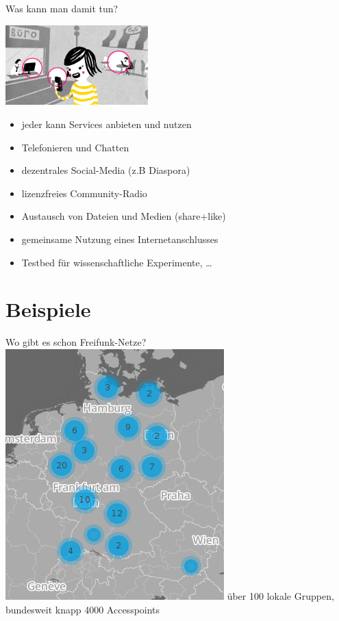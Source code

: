 \documentclass{beamer}
\begin{document}
\begin{frame}{Was kann man damit tun?}
\vfill
\begin{center}
\includegraphics[width=5.5cm]{images/verbindet}
\end{center}

\begin{itemize}
\pause\item jeder kann Services anbieten und nutzen
\pause\item Telefonieren und Chatten
\pause\item dezentrales Social-Media (z.B Diaspora)
\pause\item lizenzfreies Community-Radio
\pause\item Austausch von Dateien und Medien (share+like)
\pause\item gemeinsame Nutzung eines Internetanschlusses
\pause\item Testbed f\"ur wissenschaftliche Experimente, \ldots
\end{itemize}
\vfill
\end{frame}

\section{Beispiele}
\begin{frame}{Wo gibt es schon Freifunk-Netze?}
\vfill
\centering
\includegraphics[scale=0.5]{images/map}
\vfill
über 100 lokale Gruppen, bundesweit knapp 4000 Accesspoints
\vfill
\end{frame}
\end{document}
